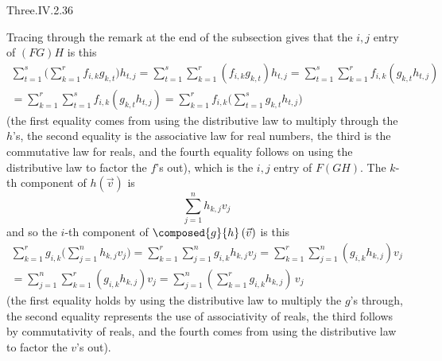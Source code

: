 \begin{ans}{Three.IV.2.36}
       \begin{exparts}
         \partsitem Tracing through the remark at the end of the subsection
           gives that the \( i,j \) entry of \( (FG)H \) is this
           \begin{multline*}
             \sum_{t=1}^s\bigl(\sum_{k=1}^{r} f_{i,k}g_{k,t}\bigr)h_{t,j}
             =\sum_{t=1}^s\sum_{k=1}^{r} (f_{i,k}g_{k,t})h_{t,j}
             =\sum_{t=1}^s\sum_{k=1}^{r} f_{i,k}(g_{k,t}h_{t,j})  \\
             =\sum_{k=1}^{r}\sum_{t=1}^s f_{i,k}(g_{k,t}h_{t,j})
             =\sum_{k=1}^{r}f_{i,k}\bigl(\sum_{t=1}^s g_{k,t}h_{t,j}\bigr)
           \end{multline*}
           (the first equality comes from using
           the distributive law to multiply through
           the $h$'s, the second equality is the associative law for real
           numbers, the third is the commutative law for reals,
           and the fourth equality follows on using the distributive law to
           factor the $f$'s out),
           which is the \( i,j \) entry of \( F(GH) \).
         \partsitem The \( k \)-th component of \( h(\vec{v})\) is
           \begin{equation*}
             \sum_{j=1}^n h_{k,j}v_j
           \end{equation*}
           and so the \( i \)-th component of
           \( \composed{g}{h}\,(\vec{v}) \) is this
           \begin{multline*}
              \sum_{k=1}^r g_{i,k}\bigl(\sum_{j=1}^n h_{k,j}v_j\bigr)
              =\sum_{k=1}^r \sum_{j=1}^n g_{i,k}h_{k,j}v_j
              =\sum_{k=1}^r \sum_{j=1}^n (g_{i,k}h_{k,j})v_j
                                                              \\
              =\sum_{j=1}^n \sum_{k=1}^r (g_{i,k}h_{k,j})v_j
              =\sum_{j=1}^n (\sum_{k=1}^r g_{i,k}h_{k,j})\,v_j
           \end{multline*}
           (the first equality holds by using the distributive law to multiply
           the $g$'s through, the second equality represents the use of
           associativity of reals, the third follows by commutativity of
           reals, and the fourth comes from using
           the distributive law to factor the $v$'s out).
       \end{exparts}
    
\end{ans}
